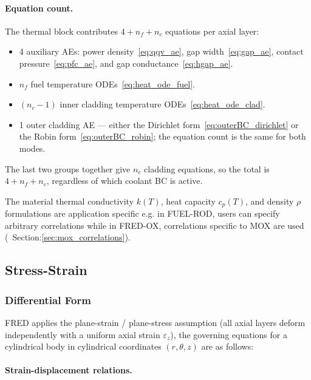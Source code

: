 \begin{refsection}
\paragraph{Equation count.} The thermal block contributes $4 + n_f + n_c$ equations per axial layer:
\begin{itemize}
\item 4 auxiliary AEs: power density~\eqref{eq:qqv_ae}, gap width~\eqref{eq:gap_ae}, contact pressure~\eqref{eq:pfc_ae}, and gap conductance~\eqref{eq:hgap_ae}.
\item $n_f$ fuel temperature ODEs~\eqref{eq:heat_ode_fuel}.
\item $(n_c - 1)$ inner cladding temperature ODEs~\eqref{eq:heat_ode_clad}.
\item 1 outer cladding AE — either the Dirichlet form~\eqref{eq:outerBC_dirichlet} or the Robin form~\eqref{eq:outerBC_robin}; the equation count is the same for both modes.
\end{itemize}
The last two groups together give $n_c$ cladding equations, so the total is $4 + n_f + n_c$, regardless of which coolant BC is active.

The material thermal conductivity $k(T)$, heat capacity $c_p(T)$, and density $\rho$ formulations are application specific e.g. in FUEL-ROD, users can specify arbitrary correlations while in FRED-OX, correlations specific to MOX are used (~Section:\ref{sec:mox_correlations}).

\subsection{Stress-Strain}
\label{sec:stress_strain}

\subsubsection{Differential Form}

FRED applies the plane-strain / plane-stress assumption (all axial layers deform independently with a uniform axial strain $\varepsilon_z$), the governing equations for a cylindrical body in cylindrical coordinates $(r,\theta,z)$ are as follows:

\paragraph{Strain-displacement relations.}


\end{refsection}
